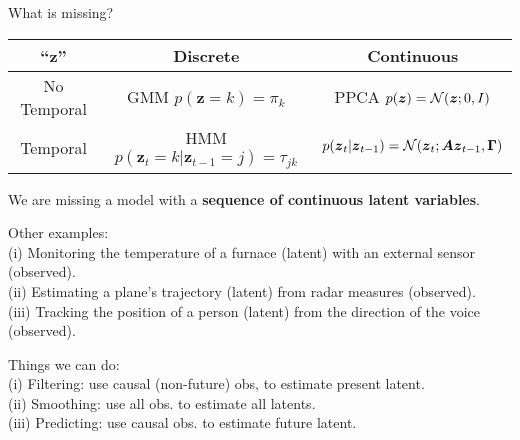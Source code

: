 \documentclass{beamer}
\newcommand{\bs}[1]{\boldsymbol{#1}}
\begin{document}
\begin{frame}{What is missing?}
\begin{center}
\footnotesize
\begin{tabular}{c||c|c}
 ``$\bs{z}$'' & Discrete & Continuous \\\hline\hline
 No Temporal & {GMM $p(\bs{z}=k) = \pi_k$} & {PPCA $p(\bs{z}) = {\cal N}(\bs{z};0,I)$}\\\hline
 Temporal & {HMM $p(\bs{z}_t=k|\bs{z}_{t-1}=j) = \tau_{jk}$} & {\color{myred}{LDS} $p(\bs{z}_t|\bs{z}_{t-1}) = {\cal N}(\bs{z}_t;\bs{A}\bs{z}_{t-1},\bs{\Gamma})$}
\end{tabular}
\end{center}\vspace{3mm}

\pause


We are missing a model with a \textbf{sequence of continuous latent variables}.\vspace{3mm}

Other examples:\vspace{3mm}\\
\footnotesize
(i) Monitoring the temperature of a furnace (latent) with an external sensor (observed).\\
(ii) Estimating a plane's trajectory (latent) from radar measures (observed).\\
(iii) Tracking the position of a person (latent) from the direction of the voice (observed).\vspace{3mm}

\normalsize
Things we can do:\vspace{3mm}\\
\footnotesize
(i) Filtering: use causal (non-future) obs, to estimate present latent.\\
(ii) Smoothing: use all obs. to estimate all latents.\\
(iii) Predicting: use causal obs. to estimate future latent.\vspace{3mm}



\end{frame}
\end{document}
